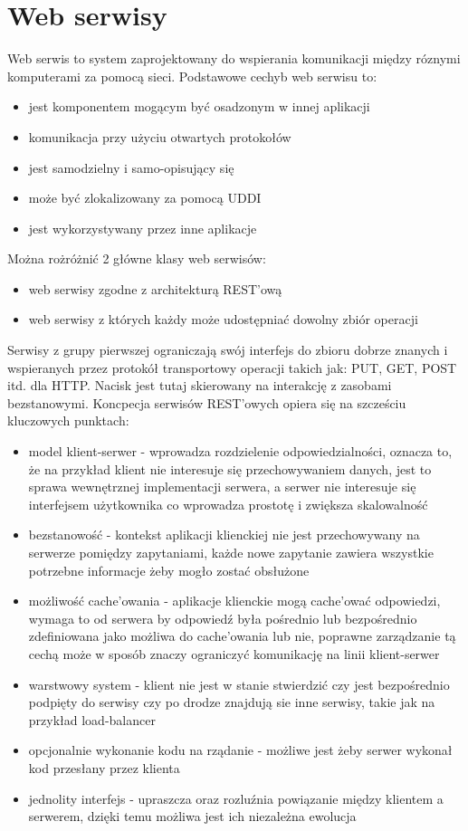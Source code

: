 \section{Web serwisy}
Web  serwis to system zaprojektowany do wspierania komunikacji między róznymi komputerami za pomocą sieci.  Podstawowe cechyb web serwisu to:
\begin{itemize}
	\item jest komponentem mogącym być osadzonym w innej aplikacji
	\item komunikacja przy użyciu otwartych protokołów
	\item jest samodzielny i samo-opisujący się
	\item może być zlokalizowany za pomocą UDDI
	\item jest wykorzystywany przez inne aplikacje
\end{itemize}  
Można rożróżnić 2 główne klasy web serwisów:
\begin{itemize}
	\item web serwisy zgodne z architekturą REST'ową
	\item web serwisy z których każdy może udostępniać dowolny zbiór operacji
\end{itemize}  
Serwisy z grupy pierwszej \cite{fielding2000} ograniczają swój interfejs do zbioru dobrze znanych i wspieranych przez protokół transportowy operacji takich jak: PUT, GET, POST itd. dla  HTTP. Nacisk jest tutaj skierowany na interakcję z zasobami bezstanowymi. Koncpecja serwisów REST'owych opiera się na szcześciu kluczowych punktach:
\begin{itemize}
	\item model klient-serwer - wprowadza rozdzielenie odpowiedzialności, oznacza to, że na przykład klient nie interesuje się przechowywaniem danych, jest to sprawa wewnętrznej implementacji serwera, a serwer nie interesuje się interfejsem użytkownika co wprowadza prostotę i zwiększa skalowalność
	\item bezstanowość - kontekst aplikacji klienckiej nie jest przechowywany na serwerze pomiędzy zapytaniami, każde nowe zapytanie zawiera wszystkie potrzebne informacje żeby mogło zostać obsłużone
	\item możliwość cache'owania - aplikacje klienckie mogą cache'ować odpowiedzi, wymaga to od serwera by odpowiedź była pośrednio lub bezpośrednio zdefiniowana jako możliwa do cache'owania lub nie, poprawne zarządzanie tą cechą może w sposób znaczy ograniczyć komunikację na linii klient-serwer
	\item warstwowy system - klient nie jest w stanie stwierdzić czy jest bezpośrednio podpięty do serwisy czy po drodze znajdują sie inne serwisy, takie jak na przykład load-balancer
	\item opcjonalnie wykonanie kodu na rządanie - możliwe jest żeby serwer wykonał kod przesłany przez klienta
	\item jednolity interfejs - upraszcza oraz rozluźnia powiązanie między klientem a serwerem, dzięki temu możliwa jest ich niezależna ewolucja
\end{itemize}   
